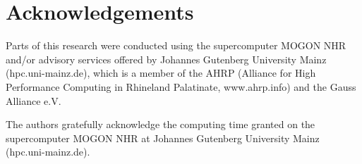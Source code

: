 \documentclass{juliacon}
\begin{document}


\maketitle













\section*{Acknowledgements}

Parts of this research were conducted using the supercomputer MOGON NHR and/or advisory services offered by Johannes Gutenberg University Mainz (hpc.uni-mainz.de), which is a member of the AHRP (Alliance for High Performance Computing in Rhineland Palatinate,  www.ahrp.info) and the Gauss Alliance e.V.

The authors gratefully acknowledge the computing time granted on the supercomputer MOGON NHR at Johannes Gutenberg University Mainz (hpc.uni-mainz.de).


\end{document}
